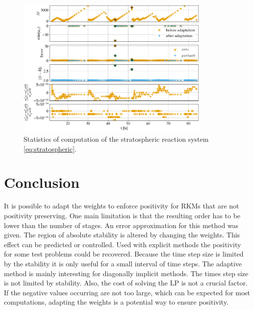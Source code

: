 \documentclass[a4paper]{article}
\numberwithin{equation}{section}
\theoremstyle{plain}
\theoremstyle{definition}
\numberwithin{theorem}{section}
\newcommand{\1}{\mathbbm{1}}
\begin{document}
\begin{figure}
\centering
\includegraphics[width=0.85\textwidth]{plots/Stratospheric_stepsize,b.pdf}
\caption{Statistics of computation of the stratospheric reaction system
         \eqref{eq:stratospheric}.}
\label{fig:Stats_Strat}
\end{figure}


\section{Conclusion} \label{sec:conclusion}

It is possible to adapt the weights to enforce positivity for RKMs that are not positivity preserving.
One main limitation is that the resulting order has to be lower than the number of stages.
An error approximation for this method was given.
The region of absolute stability is altered by changing the weights. This effect can be predicted or controlled.
Used with explicit methods the positivity for some test problems could be recovered.
Because the time step size is limited by the stability it is only useful for a small interval of time steps.
The adaptive method is mainly interesting for diagonally implicit methods.
The times step size is not limited by stability.
Also, the cost of solving the LP is not a crucial factor.
If the negative values occurring are not too large, which can be expected for most computations, adapting the weights is a potential way to ensure positivity.



\printbibliography
\end{document}
